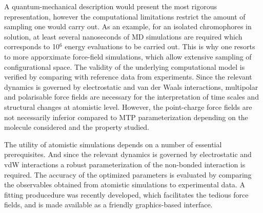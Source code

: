 \documentclass[journal=jacsat,manuscript=article]{achemso}
\begin{document}
\noindent
A quantum-mechanical description would present the most rigorous representation, however the computational limitations restrict the amount of sampling one would carry out. As an example, for an isolated chromophores in solution, at least several nanoseconds of MD simulations are required which corresponds to 10$^6$ energy evaluations to be carried out.
This is why one resorts to more apporximate force-field simulations, which allow extensive sampling of configurational space. The validity of the underlying computational model is verified by comparing with reference data from experiments.
Since the relevant dynamics is governed by electrostatic and van der Waals interactions, multipolar and polarisable force fields are necessary for the interpretation of time scales and structural changes at atomistic level. However, the point-charge force fields are not necessarily inferior compared to MTP parameterization depending on the molecule considered and the property studied.

\noindent
The utility of atomistic simulations depends on a number of essential prerequisites. And since the relevant dynamics is governed by electrostatic and vdW interactions a robust parameterization of the non-bonded interaction is required.
The accuracy of the optimized parameters is evaluated  by comparing the observables obtained from atomistic simulations to experimental data.
A fitting producedure was recently developed, which facilitates the tedious force fields, and is made available as a friendly graphics-based interface.
\end{document}
